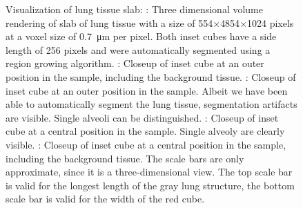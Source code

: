 \begin{figure}[p]
{%
	 	\label{subfig:LungSlabDetailsRedBG}%
		}
	\caption{Visualization of lung tissue slab: %
		: Three dimensional volume rendering of slab of lung tissue with a size of 554$\times$4854$\times$1024 pixels at a voxel size of \SI{0.7}{\micro\meter} per pixel. Both inset cubes have a side length of 256 pixels and were automatically segmented using a region growing algorithm. 
 		: Closeup of inset cube at an outer position in the sample, including the background tissue. %
 		: Closeup of inset cube at an outer position in the sample. Albeit we have been able to automatically segment the lung tissue, segmentation artifacts are visible. Single alveoli can be distinguished. %
 		: Closeup of inset cube at a central position in the sample. Single alveoly are clearly visible. %
 		: Closeup of inset cube at a central position in the sample, including the background tissue. %
		The scale bars are only approximate, since it is a three-dimensional view.  The top scale bar is valid for the longest length of the gray lung structure, the bottom scale bar is valid for the width of the red cube.%
	\label{fig:LungSlabSophie}%
	}
\end{figure}